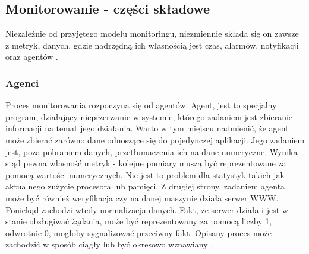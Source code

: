     \subsection{Monitorowanie - części składowe}
    Niezależnie od przyjętego modelu monitoringu, niezmiennie składa się on zawsze z metryk, danych, gdzie nadrzędną 
    ich własnością jest czas, alarmów, notyfikacji oraz agentów \cite{monitoring_and_alerting}.
    
        \subsubsection{Agenci}
        Proces monitorowania rozpoczyna się od agentów. Agent, jest to specjalny program, działający nieprzerwanie w systemie, którego
        zadaniem jest zbieranie informacji na temat jego działania. Warto w tym miejscu nadmienić, że agent może zbierać zarówno
        dane odnoszące się do pojedynczej aplikacji. Jego zadaniem jest, poza pobraniem danych, przetłumaczenia ich na dane 
        numeryczne. Wynika stąd pewna własność metryk - kolejne pomiary muszą być reprezentowane za pomocą wartości numerycznych.
        Nie jest to problem dla statystyk takich jak aktualnego zużycie procesora lub pamięci. Z drugiej strony, zadaniem agenta
        może być również weryfikacja czy na danej maszynie działa serwer WWW. Poniekąd zachodzi wtedy normalizacja danych. Fakt, że
        serwer działa i jest w stanie obsługiwać żądania, może być reprezentowany za pomocą liczby 1, odwrotnie 0, mogłoby sygnalizować
        przeciwny fakt. Opisany proces może zachodzić w sposób ciągły lub być okresowo wznawiany \cite{monitoring_and_alerting}.
        
